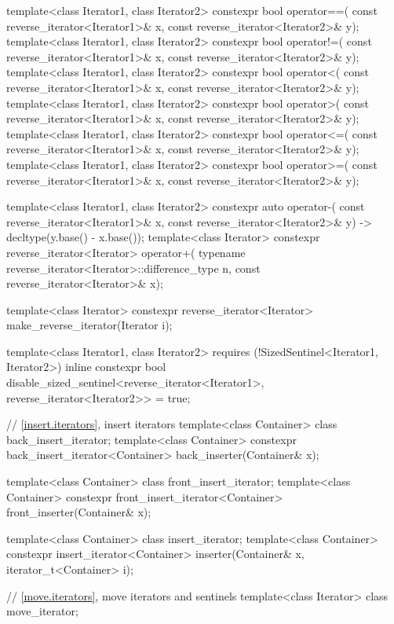 \begin{codeblock}
{  template<class Iterator1, class Iterator2>
    constexpr bool operator==(
      const reverse_iterator<Iterator1>& x,
      const reverse_iterator<Iterator2>& y);
  template<class Iterator1, class Iterator2>
    constexpr bool operator!=(
      const reverse_iterator<Iterator1>& x,
      const reverse_iterator<Iterator2>& y);
  template<class Iterator1, class Iterator2>
    constexpr bool operator<(
      const reverse_iterator<Iterator1>& x,
      const reverse_iterator<Iterator2>& y);
  template<class Iterator1, class Iterator2>
    constexpr bool operator>(
      const reverse_iterator<Iterator1>& x,
      const reverse_iterator<Iterator2>& y);
  template<class Iterator1, class Iterator2>
    constexpr bool operator<=(
      const reverse_iterator<Iterator1>& x,
      const reverse_iterator<Iterator2>& y);
  template<class Iterator1, class Iterator2>
    constexpr bool operator>=(
      const reverse_iterator<Iterator1>& x,
      const reverse_iterator<Iterator2>& y);

  template<class Iterator1, class Iterator2>
    constexpr auto operator-(
      const reverse_iterator<Iterator1>& x,
      const reverse_iterator<Iterator2>& y) -> decltype(y.base() - x.base());
  template<class Iterator>
    constexpr reverse_iterator<Iterator>
      operator+(
    typename reverse_iterator<Iterator>::difference_type n,
    const reverse_iterator<Iterator>& x);

  template<class Iterator>
    constexpr reverse_iterator<Iterator> make_reverse_iterator(Iterator i);

  template<class Iterator1, class Iterator2>
      requires (!SizedSentinel<Iterator1, Iterator2>)
    inline constexpr bool disable_sized_sentinel<reverse_iterator<Iterator1>,
                                                 reverse_iterator<Iterator2>> = true;

  // \ref{insert.iterators}, insert iterators
  template<class Container> class back_insert_iterator;
  template<class Container>
    constexpr back_insert_iterator<Container> back_inserter(Container& x);

  template<class Container> class front_insert_iterator;
  template<class Container>
    constexpr front_insert_iterator<Container> front_inserter(Container& x);

  template<class Container> class insert_iterator;
  template<class Container>
    constexpr insert_iterator<Container>
      inserter(Container& x, iterator_t<Container> i);

  // \ref{move.iterators}, move iterators and sentinels
  template<class Iterator> class move_iterator;

}
\end{codeblock}
